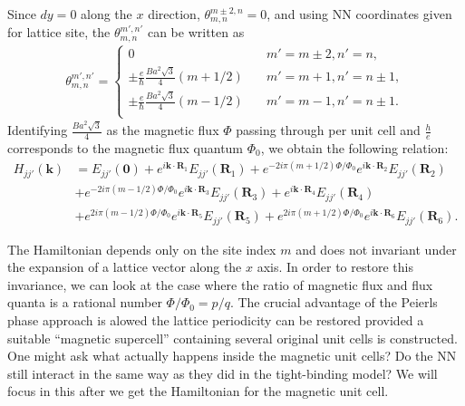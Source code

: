 \documentclass{report}
\begin{document}
\noindent Since $dy = 0$ along the $x$ direction, $\theta_{m,n}^{m \pm 2, n} = 0$, and using \ac{NN} coordinates given for lattice site, the $\theta_{m,n}^{m',n'}$ can be written as
\begin{gather}
	\theta_{m,n}^{m',n'} =
	\begin{cases}
		0                                                         & \quad m' = m \pm 2, n' = n  ,    \\
		\pm \frac{e}{\hbar} \frac{B a^{2} \sqrt{3}}{4} (m + 1 /2) & \quad m' = m + 1, n' = n \pm 1 , \\
		\pm \frac{e}{\hbar} \frac{B a^{2} \sqrt{3}}{4} (m - 1 /2) & \quad m' = m - 1, n' = n \pm 1.  \\
	\end{cases}
\end{gather}
Identifying $\frac{B a^{2} \sqrt{3}}{4}$ as the magnetic flux $\Phi$ passing through per unit cell and $\frac{h}{e}$ corresponds to the magnetic flux quantum $\Phi_{0}$, we obtain the following relation:
\begin{equation}
	\begin{aligned}
		H_{jj'}(\mathbf{k})
		 & = E_{jj'}(\mathbf{0}) + e^{i \mathbf{k} \cdot \mathbf{R}_{1}} E_{jj'}(\mathbf{R}_{1}) + e^{-2i\pi(m + 1/2)\Phi / \Phi_{0}} e^{i \mathbf{k} \cdot \mathbf{R}_{2}} E_{jj'}(\mathbf{R}_{2})             \\
		 & + e^{-2i\pi(m - 1/2)\Phi / \Phi_{0}} e^{i \mathbf{k} \cdot \mathbf{R}_{3}} E_{jj'}(\mathbf{R}_{3}) + e^{i \mathbf{k} \cdot \mathbf{R}_{4}} E_{jj'}(\mathbf{R}_{4})                                   \\
		 & + e^{2i\pi(m - 1/2)\Phi / \Phi_{0}} e^{i \mathbf{k} \cdot \mathbf{R}_{5}} E_{jj'}(\mathbf{R}_{5}) + e^{2i\pi(m + 1/2)\Phi / \Phi_{0}} e^{i \mathbf{k} \cdot \mathbf{R}_{6}} E_{jj'}(\mathbf{R}_{6}).
	\end{aligned}
\end{equation}

The Hamiltonian depends only on the site index $m$ and does not invariant under the expansion of a lattice vector along the $x$ axis. In order to restore this invariance, we can look at the case where the ratio of magnetic flux and flux quanta is a rational number $\Phi / \Phi_{0} = p / q$. The crucial advantage of the Peierls phase approach is alowed the lattice periodicity can be restored provided a suitable ``magnetic supercell'' containing several original unit cells is constructed. One might ask what actually happens inside the magnetic unit cells? Do the \ac{NN} still interact in the same way as they did in the tight-binding model? We will focus in this after we get the Hamiltonian for the magnetic unit cell.
\end{document}

